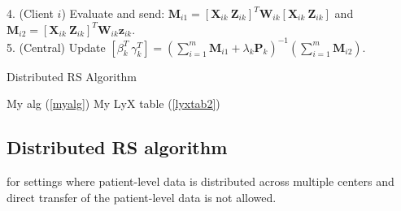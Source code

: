\documentclass[
  12pt,
]{article}
\begin{document}
\begin{algorithm}[H]
{{{{                4. (Client $i$) Evaluate and send: $\boldsymbol{M}_{i1} = [\boldsymbol{X}_{ik} \: \boldsymbol{Z}_{ik}]^T \boldsymbol{W}_{ik} [\boldsymbol{X}_{ik} \: \boldsymbol{Z}_{ik}]$ and $\boldsymbol{M}_{i2} = [\boldsymbol{X}_{ik} \: \boldsymbol{Z}_{ik}]^T \boldsymbol{W}_{ik} \boldsymbol{z}_{ik}$. \\
                5. (Central) Update $[\beta_k^T \: \gamma_k^T] = (\sum_{i = 1}^m \boldsymbol{M}_{i1} + \lambda_k \boldsymbol{P}_k)^{-1}(\sum_{i = 1}^m \boldsymbol{M}_{i2})$. \\ 
            }
        }
    }
  }
\caption{Distributed RS Algorithm}
\label{myalg}
\end{algorithm}

My alg (\ref{myalg})
My LyX table (\ref{lyxtab2})

\hypertarget{distributed-rs-algorithm-1}{%
\subsection{Distributed RS algorithm}\label{distributed-rs-algorithm-1}}

for settings where patient-level data is distributed across multiple centers and direct transfer of the patient-level data is not allowed.
\end{document}
